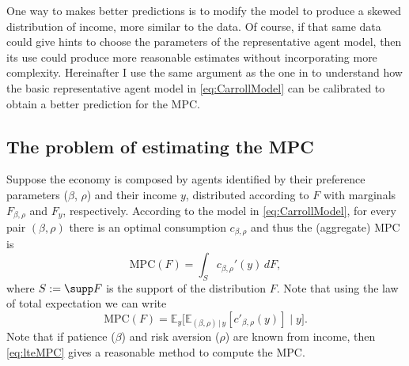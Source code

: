 \documentclass[english, a4paper,12pt]{article}
\begin{document}
One way to makes better predictions is to modify the model to produce a skewed distribution of income, more similar to the data. Of course, if that same data could give hints to choose the parameters of the representative agent model, then its use could produce more reasonable estimates without incorporating more complexity. Hereinafter I use the same argument as the one in  to understand how the basic representative agent model in \eqref{eq:CarrollModel} can be calibrated to obtain a better prediction for the MPC.

\subsection{The problem of estimating the MPC}
Suppose the economy is composed by agents identified by their preference parameters ($\beta$, $\rho$) and their income $y$, distributed according to $F$ with marginals $F_{\beta, \rho}$ and $F_{y}$, respectively. According to the model in \eqref{eq:CarrollModel}, for every pair $(\beta,\rho)$ there is an optimal consumption $c_{\beta,\rho}$ and thus the (aggregate) MPC is 
	$$ \mathrm{MPC}(F) = \int_{S} c_{\beta,\rho}'(y) \, dF, $$
where $S := \supp F$ is the support of the distribution $F$. Note that using the law of total expectation we can write
	\begin{equation} \label{eq:lteMPC}
		\mathrm{MPC}(F) = \mathbb{E}_{y}\Big[ \mathbb{E}_{(\beta,\rho) \, | \, y}[c'_{\beta,\rho}(y)] \; \Big| \; y \Big].
	\end{equation}
Note that if patience ($\beta$) and risk aversion ($\rho$) are known from income, then \eqref{eq:lteMPC} gives a reasonable method to compute the MPC.
\end{document}
